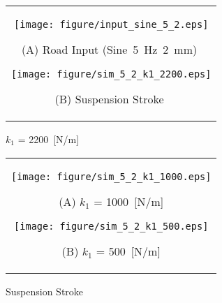 \documentclass[a4paper,12pt]{article_vdlab_sotsuron}
\begin{document}
\vspace{15mm}
\begin{figure}[h]
    \begin{tabular}{c}
      \begin{minipage}{0.45\hsize}
	\begin{center}
	  \texttt{[image: figure/input\_sine\_5\_2.eps]}
	\end{center}
	\begin{center}
	  \vspace{2mm}
	  \ (A) Road Input (Sine~5~Hz~2~mm) \
	  \end{center}
      \end{minipage}
      \begin{minipage}{0.5\hsize}
	\begin{center}
	  \texttt{[image: figure/sim\_5\_2\_k1\_2200.eps]}
	\end{center}
	\begin{center}
	  \vspace{2mm}
	  \ (B) Suspension Stroke \
	  \end{center}
      \end{minipage}
    \end{tabular}
    \vspace{2mm}
    \caption{$k_1$ = 2200~[N/m]}
    \label{fig:sim_k1}
\end{figure}
\vspace{15mm}
\begin{figure}[h]
    \begin{tabular}{c}
      \begin{minipage}{0.45\hsize}
	\begin{center}
	  \texttt{[image: figure/sim\_5\_2\_k1\_1000.eps]}
	\end{center}
	\begin{center}
	  \vspace{2mm}
	  \ (A) $k_1$ = 1000~[N/m]\
	  \end{center}
      \end{minipage}
      \begin{minipage}{0.5\hsize}
	\begin{center}
	  \texttt{[image: figure/sim\_5\_2\_k1\_500.eps]}
	\end{center}
	\begin{center}
	  \vspace{2mm}
	  \ (B) $k_1$ = 500~[N/m]\
	  \end{center}
      \end{minipage}
    \end{tabular}
    \vspace{2mm}
    \caption{Suspension Stroke}
    \label{fig:sim_k1_1}
\end{figure}
\end{document}

